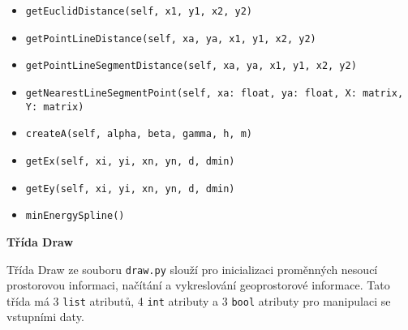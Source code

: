 \begin{itemize}
    \item \verb|getEuclidDistance(self, x1, y1, x2, y2)|
    \item \verb|getPointLineDistance(self, xa, ya, x1, y1, x2, y2)|
    \item \verb|getPointLineSegmentDistance(self, xa, ya, x1, y1, x2, y2)|
    \item \verb|getNearestLineSegmentPoint(self, xa: float, ya: float, X: matrix, Y: matrix)|
    \item \verb|createA(self, alpha, beta, gamma, h, m)|
    \item \verb|getEx(self, xi, yi, xn, yn, d, dmin)|
    \item \verb|getEy(self, xi, yi, xn, yn, d, dmin)|
    \item \verb|minEnergySpline()|
\end{itemize}
\bigbreak

\par {\large\textbf{Třída Draw} }
\par Třída Draw ze souboru \verb|draw.py| slouží pro inicializaci proměnných nesoucí prostorovou informaci, načítání a vykreslování geoprostorové informace. Tato třída má 3 \verb|list| atributů, 4 \verb|int| atributy a 3 \verb|bool| atributy pro manipulaci se vstupními daty.


